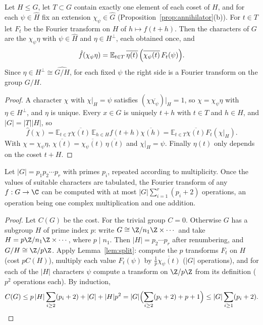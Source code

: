 \begin{lemma}\label{lem:split}
Let $H\le G$, let $T\subset G$ contain exactly one element of each coset of $H$, and for each $\psi\in\widehat H$ fix an extension
$\chi_\psi\in\widehat G$ (Proposition~\ref{prop:annihilator}(b)). For $t\in T$ let $F_t$ be the Fourier transform on $H$ of $h\mapsto f(t+h)$.
Then the characters of $G$ are the $\chi_\psi\eta$ with $\psi\in\widehat H$ and $\eta\in H^\perp$, each obtained once, and
\[\hat f(\chi_\psi\eta)=\mathbb E_{t\in T}\,\overline{\eta(t)}\,\Bigl(\overline{\chi_\psi(t)}\,F_t(\psi)\Bigr).\]
Since $\eta\in H^\perp\cong\widehat{G/H}$, for each fixed $\psi$ the right side is a Fourier transform on the group $G/H$.
\end{lemma}
\begin{proof}
A character $\chi$ with $\chi|_H=\psi$ satisfies $(\chi\overline{\chi_\psi})|_H=1$, so $\chi=\chi_\psi\eta$ with $\eta\in H^\perp$, and $\eta$
is unique. Every $x\in G$ is uniquely $t+h$ with $t\in T$ and $h\in H$, and $|G|=|T||H|$, so
\[\hat f(\chi)=\mathbb E_{t\in T}\overline{\chi(t)}\,\mathbb E_{h\in H}f(t+h)\overline{\chi(h)}=\mathbb E_{t\in T}\overline{\chi(t)}F_t(\chi|_H).\]
With $\chi=\chi_\psi\eta$, $\overline{\chi(t)}=\overline{\chi_\psi(t)}\,\overline{\eta(t)}$ and $\chi|_H=\psi$. Finally $\eta(t)$ only depends on the coset $t+H$.
\end{proof}

\begin{theorem}\label{thm:fftgeneral}
Let $|G|=p_1p_2\cdots p_r$ with primes $p_i$, repeated according to multiplicity. Once the values of suitable characters are
tabulated, the Fourier transform of any $f:G\to\C$ can be computed with at most $|G|\sum_{i=1}^r(p_i+2)$ operations, an operation being
one complex multiplication and one addition.
\end{theorem}
\begin{proof}
Let $C(G)$ be the cost. For the trivial group $C=0$. Otherwise $G$ has a subgroup $H$ of prime index $p$: write $G\cong\Z/n_1\Z\times\cdots$ and
take $H=p\Z/n_1\Z\times\cdots$, where $p\mid n_1$. Then $|H|=p_2\cdots p_r$ after renumbering, and $G/H\cong\Z/p\Z$. Apply Lemma~\ref{lem:split}:
compute the $p$ transforms $F_t$ on $H$ (cost $pC(H)$), multiply each value $F_t(\psi)$ by $\frac1p\overline{\chi_\psi(t)}$ ($|G|$
operations), and for each of the $|H|$ characters $\psi$ compute a transform on $\Z/p\Z$ from its definition ($p^2$ operations each). By
induction,
\[C(G)\le p\,|H|\sum_{i\ge2}(p_i+2)+|G|+|H|p^2=|G|\Bigl(\sum_{i\ge2}(p_i+2)+p+1\Bigr)\le|G|\sum_{i\ge1}(p_i+2).\]
\end{proof}

